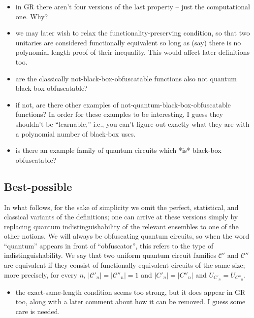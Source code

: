 \documentclass[11pt]{article}
\numberwithin{equation}{section}
\begin{document}
{\begin{itemize}
\item in GR there aren't four versions of the last property -- just the computational one. Why?
\item we may later wish to relax the functionality-preserving condition, so that two unitaries are considered functionally equivalent so long as (say) there is no polynomial-length proof of their inequality. This would affect later definitions too.
\item are the classically not-black-box-obfuscatable functions also not quantum black-box obfuscatable?
\item if not, are there other examples of not-quantum-black-box-obfuscatable functions? In order for these examples to be interesting, I guess they shouldn't be ``learnable,'' i.e., you can't figure out exactly what they are with a polynomial number of black-box uses.
\item is there an example family of quantum circuits which *is* black-box obfuscatable?
\end{itemize}

\subsection{Best-possible}

In what follows, for the sake of simplicity we omit the perfect, statistical, and classical variants of the definitions; one can arrive at these versions simply by replacing quantum indistinguishability of the relevant ensembles to one of the other notions. We will always be obfuscating quantum circuits, so when the word ``quantum'' appears in front of ``obfuscator'', this refers to the type of indistinguishability. We say that two uniform quantum circuit families $\mathcal C'$ and $\mathcal C''$ are equivalent if they consist of functionally equivalent circuits of the same size; more precisely, for every $n$, $|\mathcal C'_n| = |\mathcal C''_n| = 1$ and $|C'_n| = |C''_n|$  and $U_{C'_n} = U_{C''_n}$.

\begin{itemize}
\item the exact-same-length condition seems too strong, but it does appear in GR too, along with a later comment about how it can be removed. I guess some care is needed.
\end{itemize}

}
\end{document}
